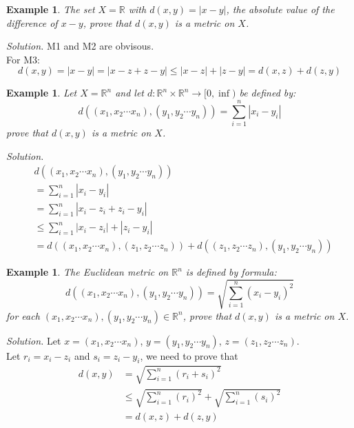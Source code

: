 \documentclass[12pt,a4paper]{article}
\theoremstyle{plain}
\newtheorem{example}[theorem]{Example}
\begin{document}
\begin{example}
    The set $X=\mathbb{R}$ with $d(x,y)=|x-y|$, the absolute value of the difference of $x-y$, prove that $d(x,y)$ is a metric on $X$. 
\end{example}
\noindent\emph{Solution.} M1 and M2 are obvisous. \\
For M3: 
\begin{equation}
    d(x,y) = |x-y| = |x-z+z-y| \leq |x-z| + |z-y| = d(x,z) + d(z,y)
\end{equation}

\begin{example}
    \label{manhattan}
    Let $X=\mathbb{R}^n$ and let $d:\mathbb{R}^n\times \mathbb{R}^n\rightarrow [0,\inf)$ be defined by:
    \begin{equation}
        d((x_1,x_2\cdots x_n),(y_1,y_2\cdots y_n)) = \sum^n_{i=1}|x_i-y_i|
    \end{equation}
    prove that $d(x,y)$ is a metric on $X$. 
\end{example}
\noindent\emph{Solution.}
\begin{equation}
    \begin{split}
        &d((x_1,x_2\cdots x_n),(y_1,y_2\cdots y_n))\\
        &= \sum^n_{i=1}|x_i-y_i| \\
        &= \sum^n_{i=1}|x_i-z_i + z_i - y_i|\\
        &\leq \sum^n_{i=1}|x_i-z_i| +| z_i - y_i| \\
        &=d((x_1,x_2\cdots x_n),(z_1,z_2\cdots z_n))+d((z_1,z_2\cdots z_n),(y_1,y_2\cdots y_n))
    \end{split}
\end{equation}

\begin{example}
    The \emph{Euclidean metric} on $\mathbb{R}^n$ is defined by formula:
    \begin{equation}
        d((x_1,x_2\cdots x_n),(y_1,y_2\cdots y_n))=\sqrt{\sum^n_{i=1}(x_i-y_i)^2}
    \end{equation}
    for each $(x_1,x_2\cdots x_n), (y_1,y_2\cdots y_n) \in \mathbb{R}^n$, prove that $d(x,y)$ is a metric on $X$. 
\end{example}
\noindent\emph{Solution.}
Let $x=(x_1,x_2\cdots x_n)$, $y=(y_1,y_2\cdots y_n)$, $z=(z_1,z_2\cdots z_n)$. \\
Let $r_i=x_i-z_i$ and $s_i=z_i-y_i$, we need to prove that 
\begin{equation}
    \begin{split}
        d(x,y)&=\sqrt{\sum^n_{i=1}(r_i+s_i)^2} \\
        &\leq\sqrt{\sum^n_{i=1}(r_i)^2}+\sqrt{\sum^n_{i=1}(s_i)^2} \\
        &=d(x,z) + d(z,y)
    \end{split}
\end{equation}
\end{document}
